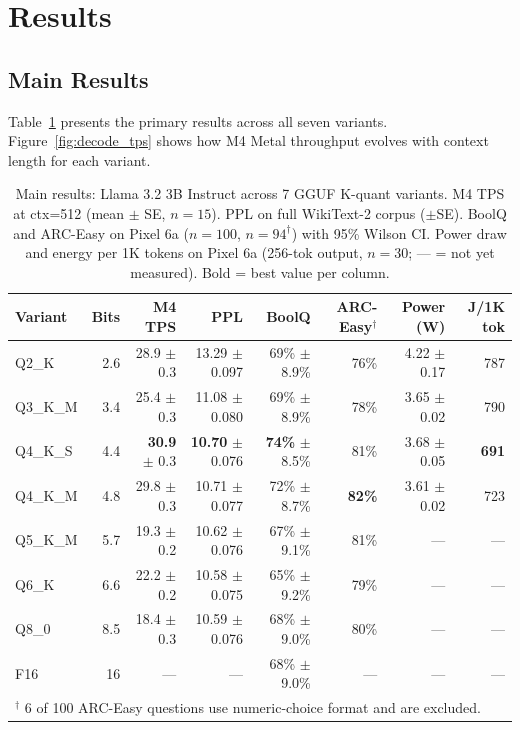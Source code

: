 \documentclass{article}
\begin{document}
\section{Results}
\label{sec:results}

\subsection{Main Results}

Table~\ref{tab:main} presents the primary results across all seven variants. Figure~\ref{fig:decode_tps} shows how M4 Metal throughput evolves with context length for each variant.

\begin{table}[ht]
\centering
\caption{Main results: Llama 3.2 3B Instruct across 7 GGUF K-quant variants. M4 TPS at ctx=512 (mean $\pm$ SE, $n=15$). PPL on full WikiText-2 corpus ($\pm$SE). BoolQ and ARC-Easy on Pixel 6a ($n=100$, $n=94^\dagger$) with 95\% Wilson CI. Power draw and energy per 1K tokens on Pixel 6a (256-tok output, $n=30$; --- = not yet measured). Bold = best value per column.}
\label{tab:main}
\small
\begin{tabular}{lrrrrrrr}
\toprule
\textbf{Variant} & \textbf{Bits} & \textbf{M4 TPS} & \textbf{PPL} & \textbf{BoolQ} & \textbf{ARC-Easy$^\dagger$} & \textbf{Power (W)} & \textbf{J/1K tok} \\
\midrule
Q2\_K    & 2.6 & 28.9 $\pm$ 0.3 & 13.29 $\pm$ 0.097 & 69\% $\pm$8.9\% & 76\% & 4.22 $\pm$0.17 & 787 \\
Q3\_K\_M  & 3.4 & 25.4 $\pm$ 0.3 & 11.08 $\pm$ 0.080 & 69\% $\pm$8.9\% & 78\% & 3.65 $\pm$0.02 & 790 \\
Q4\_K\_S  & 4.4 & \textbf{30.9} $\pm$ 0.3 & \textbf{10.70} $\pm$ 0.076 & \textbf{74\%} $\pm$8.5\% & 81\% & 3.68 $\pm$0.05 & \textbf{691} \\
Q4\_K\_M  & 4.8 & 29.8 $\pm$ 0.3 & 10.71 $\pm$ 0.077 & 72\% $\pm$8.7\% & \textbf{82\%} & 3.61 $\pm$0.02 & 723 \\
Q5\_K\_M  & 5.7 & 19.3 $\pm$ 0.2 & 10.62 $\pm$ 0.076 & 67\% $\pm$9.1\% & 81\% & --- & --- \\
Q6\_K    & 6.6 & 22.2 $\pm$ 0.2 & 10.58 $\pm$ 0.075 & 65\% $\pm$9.2\% & 79\% & --- & --- \\
Q8\_0    & 8.5 & 18.4 $\pm$ 0.3 & 10.59 $\pm$ 0.076 & 68\% $\pm$9.0\% & 80\% & --- & --- \\
\midrule
F16      & 16  & ---            & ---               & 68\% $\pm$9.0\% & --- & --- & --- \\
\bottomrule
\multicolumn{8}{l}{\footnotesize $^\dagger$ 6 of 100 ARC-Easy questions use numeric-choice format and are excluded.}
\end{tabular}
\end{table}
\end{document}
